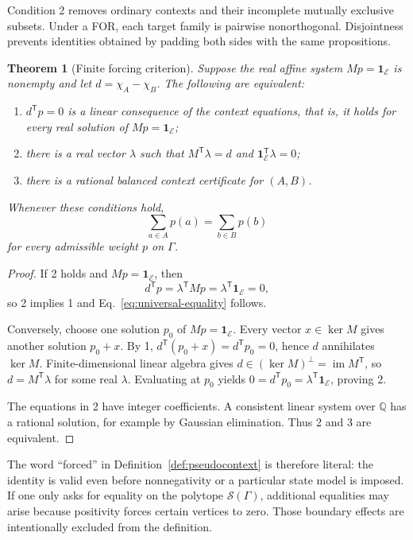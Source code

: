 \documentclass[
  twocolumn,
  aps,
  pra,
  floatfix,
  amsmath,amssymb,
  longbibliography
]{revtex4-2}
\newtheorem{theorem}{Theorem}
\theoremstyle{definition}
\theoremstyle{remark}
\newcommand{\E}{\mathcal E}
\newcommand{\one}{\mathbf 1}
\begin{document}
Condition 2 removes ordinary contexts and their incomplete mutually
exclusive subsets.  Under a FOR, each target family is
pairwise nonorthogonal.  Disjointness prevents identities obtained by padding
both sides with the same propositions.

\begin{theorem}[Finite forcing criterion]
\label{thm:forcing}
Suppose the real affine system $Mp=\one_\E$ is nonempty and let
$d=\chi_A-\chi_B$.  The following are equivalent:
\begin{enumerate}
  \item $d^{\mathsf T}p=0$ is a linear consequence of the context equations,
        that is, it holds for every real solution of
        $Mp=\one_\E$;
  \item there is a real vector $\lambda$ such that
        $M^{\mathsf T}\lambda=d$ and
        $\one_\E^{\mathsf T}\lambda=0$;
  \item there is a rational balanced context certificate for $(A,B)$.
\end{enumerate}
Whenever these conditions hold,
\begin{equation}
  \sum_{a\in A}p(a)=\sum_{b\in B}p(b)
  \label{eq:universal-equality}
\end{equation}
for every admissible weight $p$ %
on $\Gamma$.
\end{theorem}

\begin{proof}
If 2 holds and $Mp=\one_\E$, then
\[
 d^{\mathsf T}p
 =\lambda^{\mathsf T}Mp
 =\lambda^{\mathsf T}\one_\E
 =0,
\]
so 2 implies 1 and Eq.~\eqref{eq:universal-equality} follows.

Conversely, choose one solution $p_0$ of $Mp=\one_\E$.  Every vector
$x\in\ker M$ gives another solution $p_0+x$.  By 1,
$d^{\mathsf T}(p_0+x)=d^{\mathsf T}p_0=0$, hence $d$ annihilates
$\ker M$.  Finite-dimensional linear algebra gives
$d\in(\ker M)^\perp=\operatorname{im}M^{\mathsf T}$, so
$d=M^{\mathsf T}\lambda$ for some real $\lambda$.  Evaluating at $p_0$
yields
$0=d^{\mathsf T}p_0=\lambda^{\mathsf T}\one_\E$, proving 2.

The equations in 2 have integer coefficients.  A consistent linear system
over $\mathbb Q$ has a rational solution, for example by Gaussian
elimination.  Thus 2 and 3 are equivalent.
\end{proof}

The word ``forced'' in Definition~\ref{def:pseudocontext} is therefore literal: the identity is
valid even before nonnegativity or a particular state model is imposed.  If
one only asks for equality on the polytope $\mathcal S(\Gamma)$, additional
equalities may arise because positivity forces certain vertices to zero.
Those boundary effects are intentionally excluded from the definition.
\end{document}
